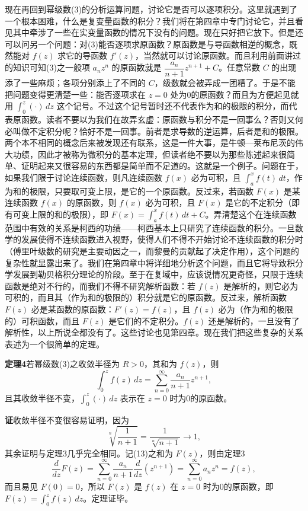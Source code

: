 现在再回到幂级数(3)的分析运算问题，讨论它是否可以逐项积分。这里就遇到了一个根本困难，什么是复变量函数的积分？我们将在第四章中专门讨论它，并且看见其中牵涉了一些在实变量函数的情况下没有的问题。现在只好把它放下。但是还可以问另一个问题：对(3)能否逐项求原函数？原函数是与导函数相逆的概念，既然能对 $f(z)$ 求它的导函数 $f'(z)$，当然就可以讨论原函数。而且利用前面讲过的知识可知(3)之一般项 $a_nz^n$ 的原函数就是 $\dfrac{a_n}{n+1}z^{n+1}+C$。任意常数 $C$ 的出现添了一些麻烦；各项分别添上了不同的 $C$，级数就会被弄成一团糟了。于是不能把问题变得更清楚一些：能否逐项求在 $z=0$ 处为0的原函数？而且为方便起见就用 $\int_0^z(\cdot)\,dz$ 这个记号。不过这个记号暂时还不代表作为和的极限的积分，而代表原函数。读者不要以为我们在故弄玄虚：原函数与积分不是一回事么？否则又何必叫做不定积分呢？恰好不是一回事。前者是求导数的逆运算，后者是和的极限。两个本不相同的概念后来被发现还有联系，这是一件大事，是牛顿—莱布尼茨的伟大功绩，因此才被称为微积分的基本定理，但读者绝不要以为那些陈述起来很简单、证明起来又很容易的东西都是简单而不足道的。这就是一个例子。问题在于，如果我们限于讨论连续函数，则凡连续函数 $f(x)$ 必为可积，且 $\int_a^x f(t)\,dt$，作为和的极限，只要取可变上限，是它的一个原函数。反过来，若函数 $F(x)$ 是某连续函数 $f(x)$ 的原函数，则 $f(x)$ 必为可积，且 $F(x)$ 是它的不定积分（即有可变上限的和的极限），即 $F(x)=\int_a^x f(t)\,dt+C$。弄清楚这个在连续函数范围中有效的关系是柯西的功绩——柯西基本上只研究了连续函数的积分。一旦数学的发展使得不连续函数进入视野，使得人们不得不开始讨论不连续函数的积分时（傅里叶级数的研究是主要动因之一，而黎曼的贡献起了决定作用），这个问题的复杂性就显露出来了。我们在第四章中将详细地分析这个问题，而且它将导致积分学发展到勒贝格积分理论的阶段。至于在复域中，应该说情况更奇怪，只限于连续函数是绝对不行的，而我们不得不研究解析函数：若 $f(z)$ 是解析的，则它必为可积的，而且其（作为和的极限的）积分就是它的原函数。反过来，解析函数 $F(z)$ 必是某函数的原函数：$F'(z)=f(z)$，且 $f(z)$ 必为（作为和的极限的）可积函数，而且 $F(z)$ 是它们的不定积分。$f(z)$ 还是解析的，一旦没有了解析性，以上所说全都没有了。这些讨论也见第四章。现在我们把这些复杂的关系表述为一个很简单的定理。

\noindent\textbf{定理4}\quad 若幂级数(3)之收敛半径为 $R>0$，其和为 $f(z)$，则
\begin{equation}
 \int_0^z f(z)\,dz=\sum_{n=0}^{\infty}\frac{a_n}{n+1}z^{n+1},
 \tag{13}
\end{equation}
且其收敛半径不变，$\int_0^z(\cdot)\,dz$ 表示在 $z=0$ 时为0的原函数。

\noindent\textbf{证}\quad 收敛半径不变很容易证明，因为
\[
 \sqrt[n]{\frac1{n+1}}=\frac1{\sqrt[n]{n+1}}\to1,
\]
其余证明与定理3几乎完全相同。记(13)之和为 $F(z)$，则由定理3
\[
 \frac d{dz}F(z)=\sum_{n=0}^{\infty}\frac{a_n}{n+1}\frac d{dz}(z^{n+1})
 =\sum_{n=0}^{\infty}a_nz^n=f(z),
\]
而且易见 $F(0)=0$，所以 $F(z)$ 是 $f(z)$ 在 $z=0$ 时为0的原函数，即 $F(z)=\int_0^z f(z)\,dz$。定理证毕。

